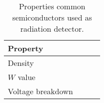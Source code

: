 \begin{table}[ht]
	\centering
	\caption[]{Properties common semiconductors used as radiation detector.}
	\label{chap3:semiconductor}
	\begin{tabular}{llll}
    \toprule
    Property &  &  &  \\
    \midrule
    Density &  &  &  \\
    $W$ value &  &  &  \\
    Voltage breakdown &  & & \\
		\bottomrule
	\end{tabular}
\end{table}